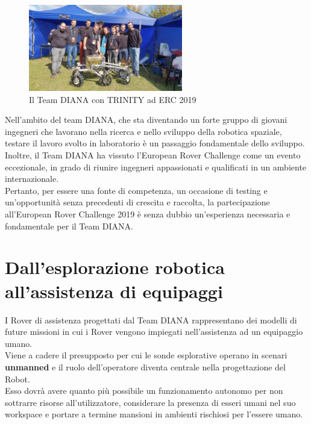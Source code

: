 \documentclass[%
corpo=11pt,
twoside,
 stile=classica,
oldstyle,
greek,%
]{toptesi}
\begin{document}
\begin{figure}
	\centering
	\includegraphics[width=0.6\textwidth]{image/trinityerc.jpeg}
	\caption{Il Team DIANA con TRINITY ad ERC 2019}
	\label{fig:trinityerc}
\end{figure}


Nell'ambito del team DIANA, che sta diventando un forte gruppo di giovani ingegneri che lavorano nella ricerca e nello sviluppo della robotica spaziale, testare il lavoro svolto in laboratorio è un passaggio fondamentale dello sviluppo.\\
Inoltre, il Team DIANA ha vissuto l'European Rover Challenge come un evento eccezionale, in grado di riunire ingegneri appassionati e qualificati in un ambiente internazionale.\\

Pertanto, per essere una fonte di competenza, un occasione di testing e un'opportunità senza precedenti di crescita e raccolta, la partecipazione all'European Rover Challenge 2019 è senza dubbio un'esperienza necessaria e fondamentale per il Team DIANA.\\

	\section{Dall'esplorazione robotica all'assistenza di equipaggi}
	I Rover di assistenza progettati dal Team DIANA rappresentano dei modelli di future missioni in cui i Rover vengono impiegati nell'assistenza ad un equipaggio umano. \\
	Viene a cadere il presupposto per cui le sonde esplorative operano in scenari \textbf{unmanned} e il ruolo dell'operatore diventa centrale nella progettazione del Robot.\\
	 Esso dovrà avere quanto più possibile un funzionamento autonomo per non sottrarre risorse all'utilizzatore, considerare la presenza di esseri umani nel suo workspace e portare a termine mansioni in ambienti rischiosi per l'essere umano. 
	 
		
\end{document}
